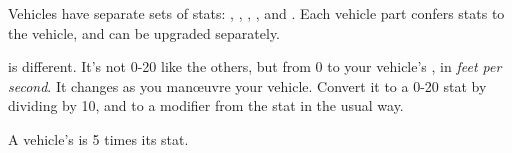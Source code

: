 
Vehicles have separate sets of stats: , , , ,  and . Each vehicle part confers stats to the vehicle, and can be upgraded separately.

 is different. It's not 0-20 like the others, but from 0 to your vehicle's , in \emph{feet per second}. It changes as you man\oe{}uvre your vehicle. Convert it to a 0-20 stat by dividing by 10, and to a modifier from the stat in the usual way.

A vehicle's  is 5 times its  stat.
